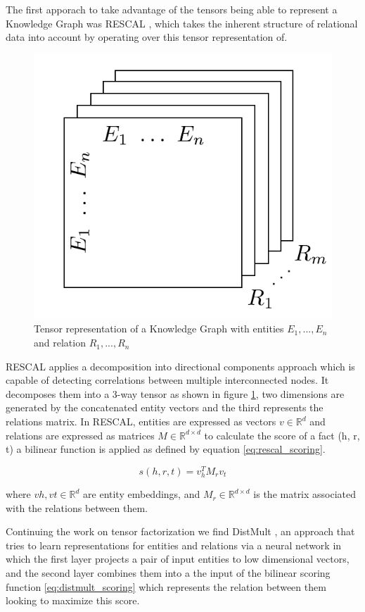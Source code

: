 The first apporach to take advantage of the tensors being able to represent a Knowledge Graph was RESCAL \cite{}, which takes the inherent structure of relational data into account by operating over this tensor representation of.

\begin{figure}[!htp]
    \centering
    \includegraphics[width=.45\textwidth]{fig/embeddings/Rescal.png}
    \caption{Tensor representation of a Knowledge Graph with entities $E_1,...,E_n$ and relation $R_1,...,R_n$}
    \label{fig:emb-rescal}
\end{figure}

RESCAL applies a decomposition into directional components approach which is capable of detecting correlations between multiple interconnected nodes. It decomposes them into a 3-way tensor as shown in figure \ref{fig:emb-rescal}, two dimensions are generated by the concatenated entity vectors and the third represents the relations matrix.
In RESCAL, entities are expressed as vectors $v \in \mathbb{R}^d$ and relations are expressed as matrices $M \in \mathbb{R}^{d \times d}$  to calculate the score of a fact (h, r, t) a bilinear function is applied as defined by equation \ref{eq:rescal_scoring}.

\begin{equation}
    \label{eq:rescal_scoring}
    s(h, r, t) = v^T_h M_r v_t
\end{equation}

where $vh, vt \in \mathbb{R}^d$ are entity embeddings, and $M_r \in \mathbb{R}^{d\times d}$ is the matrix associated with the relations between them.

Continuing the work on tensor factorization we find DistMult \cite{}, an approach that tries to learn representations for entities and relations via a neural network in which the first layer projects a pair of input entities to low dimensional vectors, and the second layer combines them into a the input of the bilinear scoring function \ref{eq:distmult_scoring} which represents the relation between them looking to maximize this score.

